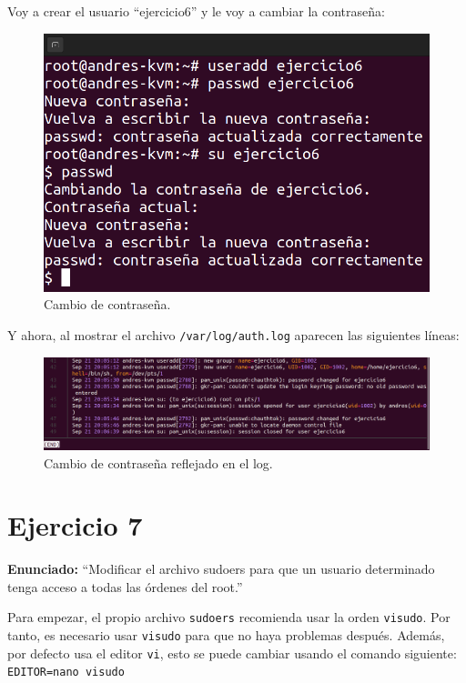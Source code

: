 \documentclass{article}
\begin{document}
\bigskip

Voy a crear el usuario ``ejercicio6'' y le voy a cambiar la contraseña:

\begin{figure}[H]
    \includegraphics[width=\textwidth]{imagenes/createejercicio6.png}
    \caption{Cambio de contraseña.}
\end{figure}

\newpage

Y ahora, al mostrar el archivo \verb|/var/log/auth.log| aparecen las siguientes líneas:

\begin{figure}[H]
    \includegraphics[width=\textwidth]{imagenes/authcreateejercicio6.png}
    \caption{Cambio de contraseña reflejado en el log.}
\end{figure}


\section{Ejercicio 7}

\textbf{Enunciado: }``Modificar el archivo sudoers para que un usuario determinado tenga acceso a todas las órdenes del root.''

\bigskip

Para empezar, el propio archivo \verb|sudoers| recomienda usar la orden \verb|visudo|. Por tanto, es necesario usar \verb|visudo| para que no haya problemas después. Además, por defecto usa el editor \verb|vi|, esto se puede cambiar usando el comando siguiente: \verb|EDITOR=nano visudo|
\end{document}

